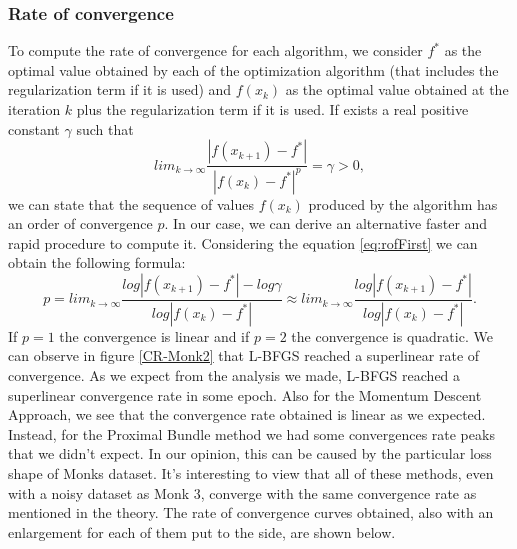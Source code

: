 \subsubsection{Rate of convergence}
\label{sec:rate_of_convergence}
To compute the rate of convergence for each algorithm, we consider $f^*$ as the optimal value obtained by each of the optimization algorithm (that includes the regularization term if it is used) and $f(x_{k})$ as the optimal value obtained at the iteration $k$ plus the regularization term if it is used. If exists a real positive constant $\gamma$ such that
\begin{equation}
\label{eq:rofFirst}
lim_{k\to \infty}\frac{|f(x_{k+1}) - f^* |}{|f(x_{k}) - f^*|^p} = \gamma > 0,
\end{equation}
we can state that the sequence of values $f(x_{k})$ produced by the algorithm has an order of convergence $p$. In our case, we can derive an alternative faster and rapid procedure to compute it. Considering the equation \ref{eq:rofFirst} we can obtain the following formula: 
\begin{equation}
p = lim_{k\to \infty}\frac{log |f(x_{k+1}) - f^* | - log \gamma}{log|f(x_{k}) - f^*|} \approx lim_{k\to \infty}\frac{log |f(x_{k+1}) - f^* |}{log|f(x_{k}) - f^*|}.
\end{equation}
If $p=1$ the convergence is linear and if $p=2$ the convergence is quadratic. We can observe in figure \ref{CR-Monk2} that L-BFGS reached a superlinear rate of convergence. 
As we expect from the analysis we made, L-BFGS reached a superlinear convergence rate in some epoch. Also for the Momentum Descent Approach, we see that the convergence rate obtained is linear as we expected. Instead, for the Proximal Bundle method we had some convergences rate peaks that we didn't expect. In our opinion, this can be caused by the particular loss shape of Monks dataset.
It's interesting to view that all of these methods, even with a noisy dataset as Monk 3, converge with the same convergence rate as mentioned in the theory. The rate of convergence curves obtained, also with an enlargement for each of them put to the side, are shown below.

